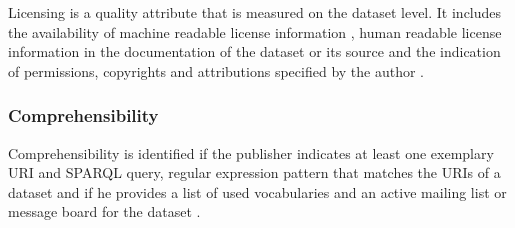 \documentclass[onecolumn, crcready]{iosart2c}
\begin{document}
Licensing is a quality attribute that is measured on the dataset level. It includes the availability of machine readable license information \cite{Hogan:2012:ESL:2263498.2264570}, human readable license information in the documentation of the dataset or its source \cite{Hogan:2012:ESL:2263498.2264570} and the indication of permissions, copyrights and attributions specified by the author \cite{Framework2012}.

\subsubsection{Comprehensibility}

Comprehensibility is identified if the publisher indicates at least one exemplary URI and SPARQL query, regular expression pattern that matches the URIs of a dataset \cite{Framework2012} and if he provides a list of used vocabularies and an active mailing list or message board for the dataset \cite{flemming2010}. 
\end{document}
